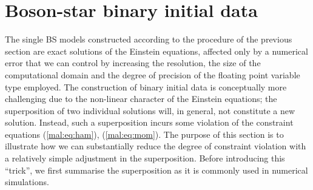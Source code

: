 \section{Boson-star binary initial data}
\label{mal:sec:superposition}
%
The single BS models constructed according to the procedure of the
previous section are exact solutions of the Einstein equations, affected
only by a numerical error that we can control by increasing the resolution,
the size of the computational domain and the degree of precision of the floating
point variable type employed. The construction of binary initial data is
conceptually more challenging due to the non-linear character of the
Einstein equations; the superposition of two individual solutions will,
in general, not constitute a new solution. Instead, such a superposition
incurs some violation of the constraint equations (\ref{mal:eq:ham}),
(\ref{mal:eq:mom}). The purpose of this section is to illustrate
how we can substantially reduce the degree of constraint
violation with a relatively simple adjustment in the
superposition. Before introducing this ``trick'', we first
summarise the superposition as it is commonly used in numerical
simulations.

